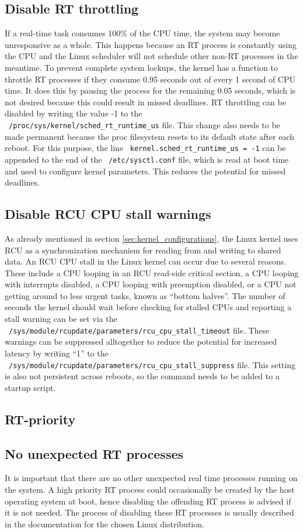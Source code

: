 \documentclass[MMR,Master,english]{twbook}
\begin{document}
\subsection{Disable RT throttling}
If a real-time task consumes 100\% of the CPU time, the system may become unresponsive as a whole. This happens because an RT process is constantly using the CPU and the Linux scheduler will not schedule other non-RT processes in the meantime. To prevent complete system lockups, the kernel has a function to throttle RT processes if they consume 0.95 seconds out of every 1 second of CPU time. It does this by pausing the process for the remaining 0.05 seconds, which is not desired because this could result in missed deadlines. RT throttling can be disabled by  writing the value -1 to the ~\texttt{/proc/sys/kernel/sched\_rt\_runtime\_us} file. This change also needs to be made permanent because the proc filesystem resets to its default state after each reboot. For this purpose, the line ~\texttt{kernel.sched\_rt\_runtime\_us = -1} can be appended to the end of the ~\texttt{/etc/sysctl.conf} file, which is read at boot time and used to configure kernel parameters. This reduces the potential for missed deadlines. 
\subsection{Disable RCU CPU stall warnings}
As already mentioned in section \ref{sec:kernel_configurations}, the Linux kernel uses RCU as a synchronization mechanism for reading from and writing to shared data. An RCU CPU stall in the Linux kernel can occur due to several reasons. These include a CPU looping in an RCU read-side critical section, a CPU looping with interrupts disabled, a CPU looping with preemption disabled, or a CPU not getting around to less urgent tasks, known as “bottom halves”. The number of seconds the kernel should wait before checking for stalled CPUs and reporting a stall warning can be set via the  ~\texttt{/sys/module/rcupdate/parameters/rcu\_cpu\_stall\_timeout} file. These warnings can be suppressed alltogether to reduce the potential for increased latency by writing ``1'' to the ~\texttt{/sys/module/rcupdate/parameters/rcu\_cpu\_stall\_suppress} file. This setting is also not persistent across reboots, so the command needs to be added to a startup script.
\subsection{RT-priority} 
\subsection{No unexpected RT processes}
It is important that there are no other unexpected real time processes running on the system. A high priority RT process could occasionally be created by the host operating system at boot, hence disabling the offending RT process is advised if it is not needed. The process of disabling these RT processes is usually described in the documentation for the chosen Linux distribution.
\end{document}
